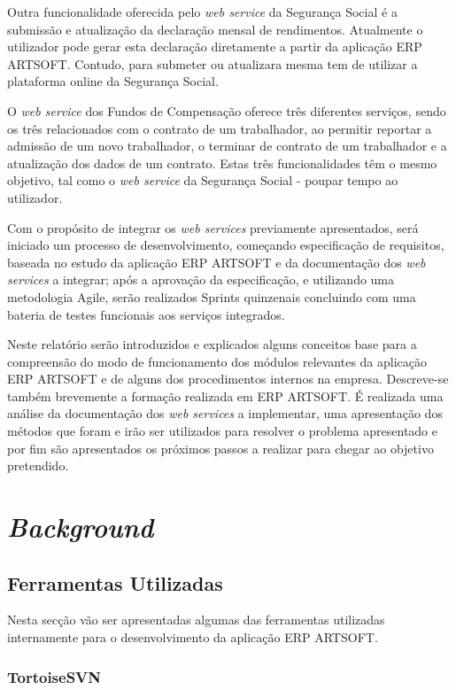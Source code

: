 \documentclass[sigplan]{acmart}
\begin{document}
Outra funcionalidade oferecida pelo \textit{web service} da Segurança Social é a submissão e atualização da declaração mensal de rendimentos. Atualmente o utilizador pode gerar esta declaração diretamente a partir da aplicação ERP ARTSOFT. Contudo, para submeter ou atualizara mesma tem de utilizar a plataforma online da Segurança Social.

O \textit{web service} dos Fundos de Compensação oferece três diferentes serviços, sendo os três relacionados com o contrato de um trabalhador, ao permitir reportar a admissão de um novo trabalhador, o terminar de contrato de um trabalhador e a atualização dos dados de um contrato. Estas três funcionalidades têm o mesmo objetivo, tal como o \textit{web service} da Segurança Social - poupar tempo ao utilizador.

Com o propósito de integrar os \textit{web services} previamente apresentados, será iniciado um processo de desenvolvimento, começando especificação de requisitos, baseada no estudo da aplicação ERP ARTSOFT e da documentação dos \textit{web services} a integrar; após a aprovação da especificação, e utilizando uma metodologia Agile, serão realizados Sprints quinzenais concluindo com uma bateria de testes funcionais aos serviços integrados.

Neste relatório serão introduzidos e explicados alguns conceitos base para a compreensão do modo de funcionamento dos módulos relevantes da aplicação ERP ARTSOFT e de alguns dos procedimentos internos na empresa. Descreve-se também brevemente a formação realizada em ERP ARTSOFT. É realizada uma análise da documentação dos \textit{web services} a implementar, uma apresentação dos métodos que foram e irão ser utilizados para resolver o problema apresentado e por fim são apresentados os próximos passos a realizar para chegar ao objetivo pretendido.

\section{\textit{Background}} \label{sec:background}

\subsection{Ferramentas Utilizadas}

Nesta secção vão ser apresentadas algumas das ferramentas utilizadas internamente para o desenvolvimento da aplicação ERP ARTSOFT.

\subsubsection{TortoiseSVN}
\end{document}

